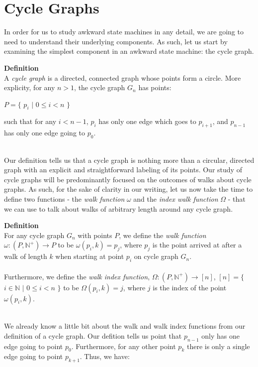 \documentclass[a4paper,12pt]{article}
\begin{document}
\section{Cycle Graphs}
In order for us to study awkward state machines in any detail, we are going to need to understand their underlying components. As such, let us start by examining the simplest component in an awkward state machine: the cycle graph.
\\
\begin{tcolorbox}
\textbf{Definition}\\
A \textit{cycle graph} is a directed, connected graph whose points form a circle. More explicity, for any $n > 1$, the cycle graph $G_n$ has points:
\begin{center}
$P = \{$ $p_i$ $|$ $0 \leq i < n$ $\}$
\end{center}
such that for any $i < n - 1$, $p_i$ has only one edge which goes to $p_{i + 1}$, and $p_{n-1}$ has only one edge going to $p_0$.
\end{tcolorbox}
\noindent
\\
Our definition tells us that a cycle graph is nothing more than a circular, directed graph with an explicit and straightforward labeling of its points. Our study of cycle graphs will be predominantly focused on the outcomes of walks about cycle graphs. As such, for the sake of clarity in our writing, let us now take the time to define two functions - the \textit{walk function} $\omega$ and the \textit{index walk function} $\Omega$ - that we can use to talk about walks of arbitrary length around any cycle graph.\\
\begin{tcolorbox}
\textbf{Definition}\\
For any cycle graph $G_n$ with points $P$, we define the \textit{walk function} $\omega: (P, \mathbb{N}^{+}) \rightarrow P$ to be $\omega(p_i, k) = p_j$, where $p_j$ is the point arrived at after a walk of length $k$ when starting at point $p_i$ on cycle graph $G_n$.\\
\\
Furthermore, we define the \textit{walk index function}, $\Omega: (P, \mathbb{N}^{+}) \rightarrow [n]$, $[n] = \{$ $i \in \mathbb{N}$ $|$ $0 \leq i < n$ $\}$ to be $\Omega(p_i, k) = j$, where $j$ is the index of the point $\omega(p_i, k)$.
\end{tcolorbox}
\noindent
\\
We already know a little bit about the walk and walk index functions from our definition of a cycle graph. Our defition tells us point that $p_{n-1}$ only has one edge going to point $p_0$. Furthermore, for any other point $p_k$ there is only a single edge going to point $p_{k+1}$. Thus, we have:
\end{document}
